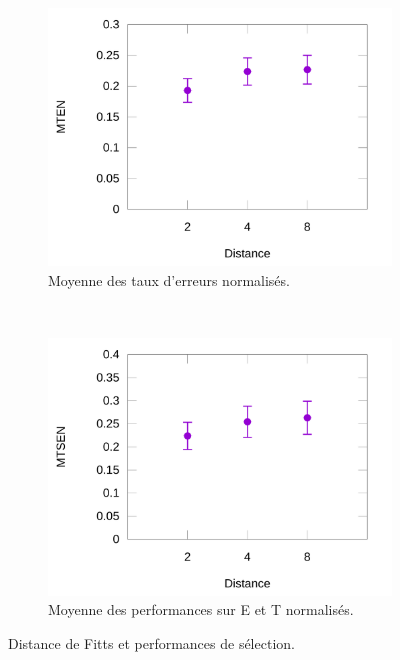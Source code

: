 \begin{figure}[htbp]
\begin{subfigure}[t]{0.49\textwidth}
			\includegraphics[width=\textwidth]{figures/ch5/normErrors}
			\caption{Moyenne des taux d'erreurs normalisés.}
			\label{fig:normErrors}
		\end{subfigure}		
		~
		\begin{subfigure}[t]{0.49\textwidth}
			\centering
			\includegraphics[width=\textwidth]{figures/ch5/normProducts}
			\caption{Moyenne des performances sur E et T normalisés.}
			\label{fig:normProducts}
		\end{subfigure}
		\caption[Distance de Fitts et performances de sélection]{Distance de Fitts et performances de sélection.}
		\label{fig:fittsDistAndPerf}
	\end{figure}

